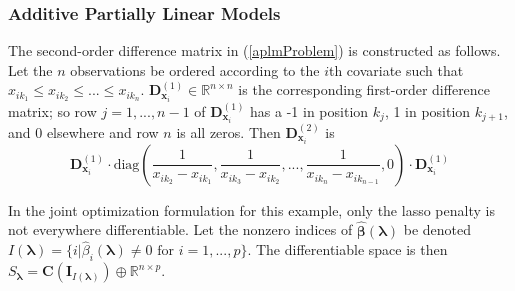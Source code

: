 \documentclass[12pt,letterpaper]{article}
\begin{document}
\subsubsection{Additive Partially Linear Models}\label{sec:aplm}
The second-order difference matrix in (\ref{aplmProblem}) is constructed as follows. Let the $n$ observations be ordered according to the $i$th covariate such that $x_{ik_1} \le x_{ik_2} \le ... \le x_{ik_n}$. $\boldsymbol{D}^{(1)}_{\boldsymbol{x}_i} \in \mathbb{R}^{n \times n}$ is the corresponding first-order difference matrix; so row $j=1,...,n-1$ of $\boldsymbol{D}^{(1)}_{\boldsymbol{x}_i}$ has a -1 in position $k_{j}$, 1 in position $k_{j+1}$, and 0 elsewhere and row $n$ is all zeros. Then $\boldsymbol{D}^{(2)}_{\boldsymbol{x}_i}$ is
\begin{equation}
\boldsymbol{D}^{(1)}_{\boldsymbol{x}_i} \cdot
\text{diag} \left ( \frac{1}{x_{ik_2} - x_{ik_1}}, \frac{1}{x_{ik_3} - x_{ik_2}}, ... , \frac{1}{x_{ik_n} - x_{ik_{n-1}}}, 0 \right )
\cdot \boldsymbol{D}^{(1)}_{\boldsymbol{x}_i}
\end{equation}

In the joint optimization formulation for this example, only the lasso penalty is not everywhere differentiable. Let the nonzero indices of $\hat{\boldsymbol{\beta}}(\boldsymbol\lambda)$ be denoted $I(\boldsymbol\lambda) = \{i | \hat{\beta}_i(\boldsymbol\lambda) \ne 0 \text{ for } i=1,...,p \}$. The differentiable space is then $S_{\boldsymbol{\lambda}} = \boldsymbol C(\boldsymbol I_{I(\boldsymbol\lambda)}) \oplus \mathbb{R}^{n \times p}$.
\end{document}
